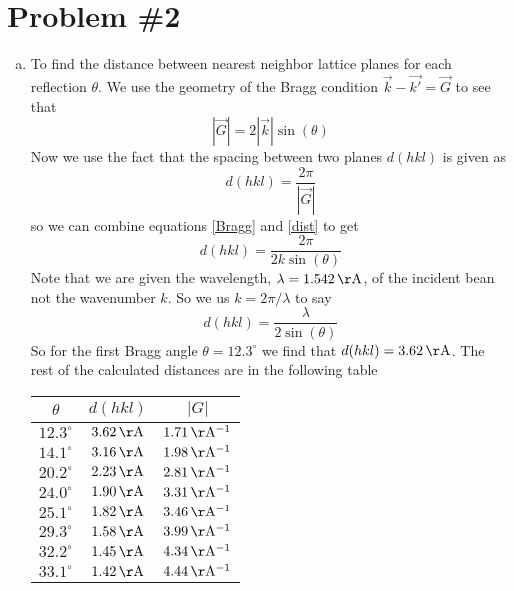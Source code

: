 \documentclass[11pt]{article}
\numberwithin{equation}{section}
\begin{document}
\section{Problem \#2}
\begin{enumerate}[(a)]
\item
To find the distance between nearest neighbor lattice planes for each reflection $\theta$. We use the geometry of the Bragg condition $\vec{k} -\vec{k'} =\vec{G}$ to see that 
\begin{equation}
|\vec{G}| = 2|\vec{k}|\sin(\theta)
\label{Bragg}
\end{equation}
Now we use the fact that the spacing between two planes $d(hkl)$ is given as
\begin{equation}
d(hkl) = \frac{2\pi}{|\vec{G}|}
\label{dist}
\end{equation}
so we can combine equations \ref{Bragg} and \ref{dist} to get
$$d(hkl) = \frac{2\pi}{2k\sin(\theta)}$$
Note that we are given the wavelength, $\lambda = 1.542\unit{\AA}$, of the incident bean not the wavenumber $k$. So we us $k = 2\pi/\lambda$ to say 
$$d(hkl) = \frac{\lambda}{2\sin(\theta)}$$
So for the first Bragg angle $\theta = 12.3^{\circ}$ we find that $d(hkl) = 3.62\unit{\AA}$. The rest of the calculated distances are in the following table
\begin{center}
\begin{tabular}{c|c|c}
$\theta$	&$d(hkl)$		&$|G|$\\
\hline
$12.3^{\circ}$	&$3.62\unit{\AA}$	&$1.71\unit{\AA^{-1}}$\\
$14.1^{\circ}$	&$3.16\unit{\AA}$	&$1.98\unit{\AA^{-1}}$\\
$20.2^{\circ}$	&$2.23\unit{\AA}$	&$2.81\unit{\AA^{-1}}$\\
$24.0^{\circ}$	&$1.90\unit{\AA}$	&$3.31\unit{\AA^{-1}}$\\
$25.1^{\circ}$	&$1.82\unit{\AA}$	&$3.46\unit{\AA^{-1}}$\\
$29.3^{\circ}$	&$1.58\unit{\AA}$	&$3.99\unit{\AA^{-1}}$\\
$32.2^{\circ}$	&$1.45\unit{\AA}$	&$4.34\unit{\AA^{-1}}$\\
$33.1^{\circ}$	&$1.42\unit{\AA}$	&$4.44\unit{\AA^{-1}}$
\end{tabular}
\end{center}


\end{enumerate}
\end{document}
